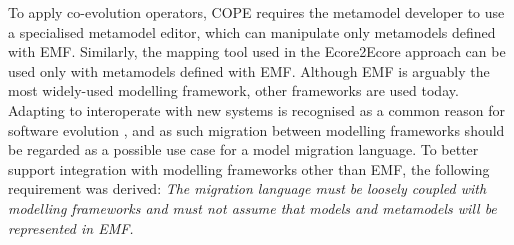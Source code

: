 To apply co-evolution operators, COPE requires the metamodel developer to use a specialised metamodel editor, which can manipulate only metamodels defined with EMF. Similarly, the mapping tool used in the Ecore2Ecore approach can be used only with metamodels defined with EMF. Although EMF is arguably the most widely-used modelling framework, other frameworks are used today. Adapting to interoperate with new systems is recognised as a common reason for software evolution \cite{sjoberg93quantifying}, and as such migration between modelling frameworks should be regarded as a possible use case for a model migration language. To better support integration with modelling frameworks other than EMF, the following requirement was derived: \emph{The migration language must be loosely coupled with modelling frameworks and must not assume that models and metamodels will be represented in EMF.}